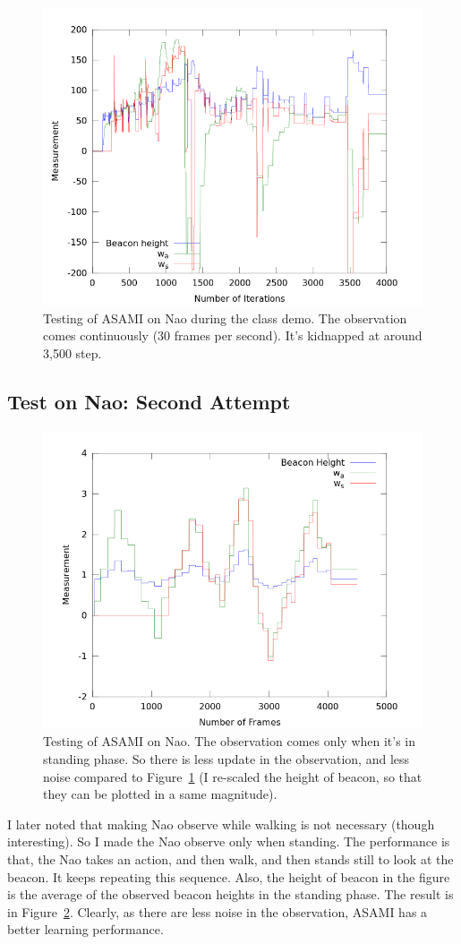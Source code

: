 \documentclass[10pt]{article}
\begin{document}
\begin{figure}[h]
\centering
\includegraphics[width=0.7\columnwidth]{demoResult.png}
\caption{Testing of ASAMI on Nao during the class demo. The
observation comes continuously (30 frames per second). It's kidnapped
at around 3,500 step.}
\label{fig:demo}
\end{figure}

\subsection{Test on Nao: Second Attempt}

\begin{figure}[h]
\centering
\includegraphics[width=0.7\columnwidth]{out_obs.png}
\caption{Testing of ASAMI on Nao. The observation comes only when it's
in standing phase. So there is less update in the observation, and
less noise compared to Figure~\ref{fig:demo} (I re-scaled the height of
beacon, so that they can be plotted in a same magnitude).}
\label{fig:obs}
\end{figure}

I later noted that making Nao observe while walking is not necessary
(though interesting). So I made the Nao observe only when standing.
The performance is that, the Nao takes an action, and then walk, and
then stands still to look at the beacon. It keeps repeating this
sequence.  Also, the height of beacon in the figure is the average of
the observed beacon heights in the standing phase. The result is in
Figure~\ref{fig:obs}. Clearly, as there are less noise in the
observation, ASAMI has a better learning performance.
\end{document}
